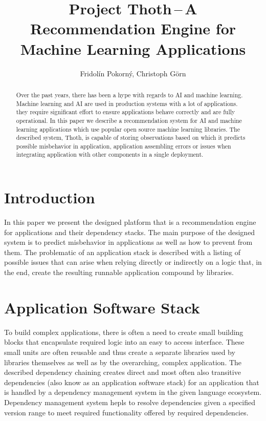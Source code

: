 \documentclass[a4paper]{llncs}
\begin{document}
%
\title{Project Thoth\,--\,A Recommendation Engine for Machine Learning Applications}
%
%
\author{Fridol\'in Pokorn\'y, Christoph G\"orn}


\maketitle
\begin{abstract}
Over the past years, there has been a hype with regards to AI and machine learning. Machine learning and AI are used in production systems with a lot of applications. they require significant effort to ensure applications behave correctly and are fully operational. In this paper we describe a recommendation system for AI and machine learning applications which use popular open source machine learning libraries. The described system, Thoth, is capable of storing observations based on which it predicts possible misbehavior in application, application assembling errors or issues when integrating application with other components in a single deployment.
\end{abstract}

\section{Introduction}

In this paper we present the designed platform that is a recommendation engine for applications and their dependency stacks. The main purpose of the designed system is to predict misbehavior in applications as well as how to prevent from them. The problematic of an application stack is described with a listing of possible issues that can arise when relying directly or indirectly on a logic that, in the end, create the resulting runnable application compound by libraries.

\section{Application Software Stack}

To build complex applications, there is often a need to create small building blocks that encapsulate required logic into an easy to access interface. These small units are often reusable and thus create a separate libraries used by libraries themselves as well as by the overarching, complex application. The described dependency chaining creates direct and most often also transitive dependencies (also know as an application software stack) for an application that is handled by a dependency management system in the given language ecosystem. Dependency management system hepls to resolve dependencies given a specified version range to meet required functionality offered by required dependencies.
\end{document}
